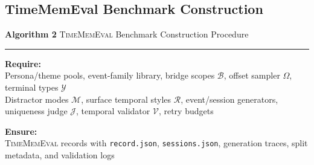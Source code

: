 \subsection{TimeMemEval Benchmark Construction}
  \label{app:timememeval-construction}

  \begin{tcolorbox}[
    enhanced jigsaw,
    breakable,
    colback=white,
    colframe=black,
    boxrule=0pt,
    borderline north={0.7pt}{0pt}{black},
    borderline south={0.7pt}{0pt}{black},
    sharp corners,
    left=0pt,
    right=0pt,
    top=2pt,
    bottom=2pt,
    before skip=0.6em,
    after skip=0.8em,
  ]
  \scriptsize
  \noindent\textbf{Algorithm 2} \textsc{TimeMemEval} Benchmark Construction Procedure

  \vspace{0.15em}
  \hrule
  \vspace{0.45em}

  \noindent\textbf{Require:}\\
  \hspace*{1.5em}Persona/theme pools, event-family library, bridge scopes
  $\mathcal{B}$, offset sampler $\Omega$, terminal types $\mathcal{Y}$\\
  \hspace*{1.5em}Distractor modes $\mathcal{M}$, surface temporal styles $\mathcal{R}$,
  event/session generators, uniqueness judge $\mathcal{J}$, temporal validator
  $\mathcal{V}$, retry budgets

  \vspace{0.25em}
  \noindent\textbf{Ensure:}\\
  \hspace*{1.5em}\textsc{TimeMemEval} records with \texttt{record.json},
  \texttt{sessions.json}, generation traces, split metadata, and validation logs


\end{tcolorbox}
